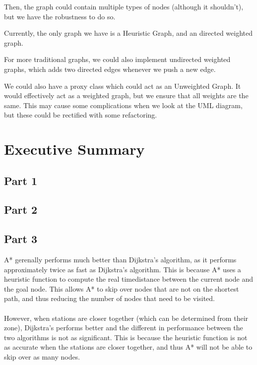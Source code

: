 \documentclass{article}
\begin{document}
Then, the graph could contain multiple types of nodes (although it shouldn't), but we have the robustness to do so.

Currently, the only graph we have is a Heuristic Graph, and an directed weighted graph.

For more traditional graphs, we could also implement undirected weighted graphs, which adds two directed edges whenever we push a new edge.

We could also have a proxy class which could act as an Unweighted Graph. It would effectively act as a weighted graph, but we ensure that all weights are the same. This may cause some complications when we look at the UML diagram, but these could be rectified with some refactoring.

\newpage
\section{Executive Summary}

\subsection{Part 1}

\subsection{Part 2}

\subsection{Part 3}

A* gerenally performs much better than Dijkstra’s algorithm, as it performs approximately twice as fast as Dijkstra’s algorithm. This is because A* uses a heuristic function to compute the real timedistance between the current node and the goal node. This allows A* to skip over nodes that are not on the shortest path, and thus reducing the number of nodes that need to be visited.\\
\\
However, when stations are closer together (which can be determined from their zone), Dijkstra’s performs better and the different in performance between the two algorithms is not as significant. This is because the heuristic function is not as accurate when the stations are closer together, and thus A* will not be able to skip over as many nodes.\\
\end{document}
